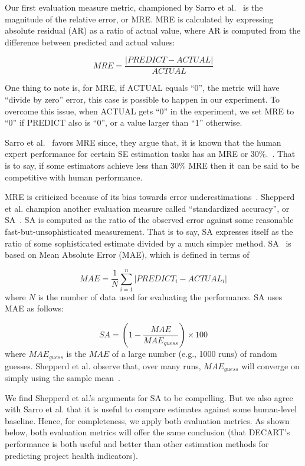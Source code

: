 \documentclass[sigconf,review,anonymous]{acmart}
\begin{document}
Our first evaluation measure metric, championed by  Sarro et al.~\cite{sarro2016multi} is the magnitude of the relative error, or MRE. MRE is calculated by expressing absolute residual (AR) as a ratio of actual value, where AR is computed from the difference between predicted and actual values:

\[
\mathit{MRE} = \frac{|\mathit{PREDICT} - \mathit{ACTUAL}|}{\mathit{ACTUAL}}
\]

One thing to note is, for MRE, if ACTUAL equals ``0'', the metric will have ``divide by zero'' error, this case is possible to happen in our experiment. To overcome this issue, when ACTUAL gets ``0'' in the experiment, we set MRE to ``0'' if PREDICT also is ``0'', or a value larger than ``1'' otherwise.

Sarro et al.~\cite{sarro2016multi} favors MRE
since, they argue that, it is known that the human expert performance
for certain SE estimation tasks  has an MRE or 30\%.~\cite{molokken2003review}. That is to say, if some estimators achieve less than 30\% MRE then it can be said to be competitive with human performance.  




MRE is criticized because of its bias towards error underestimations~\cite{foss2003simulation,kitchenham2001accuracy,korte2008confidence,port2008comparative,shepperd2000building,stensrud2003further}.  
Shepperd et al. champion another evaluation measure called ``standardized accuracy'', or SA~\cite{shepperd2012evaluating}.
SA is computed as the ratio of the observed error against some reasonable fast-but-unsophisticated measurement. That is to say, 
SA expresses itself as the ratio of some sophisticated estimate
divided by a much simpler method.
SA~\cite{langdon2016exact,shepperd2012evaluating} is based on Mean Absolute Error (MAE), which is defined in terms of 

\[
\mathit{MAE}=\frac{1}{N}\sum_{i=1}^n|\mathit{PREDICT}_i-\mathit{ACTUAL}_i|
\]
where $N$ is the number of data used for evaluating the performance. SA uses MAE as follows:

\[
\mathit{SA} = (1-\frac{\mathit{MAE}}{\mathit{MAE}_{guess}})\times 100
\]
where $\mathit{MAE}_{guess}$ is the $\mathit{MAE}$ of a large number (e.g., 1000 runs) of random guesses. 
  Shepperd et al. observe that, over many runs,  $\mathit{MAE}_{guess}$ will converge on simply using the sample mean~\cite{shepperd2012evaluating}. 

We find Shepperd et al.'s arguments for SA to be compelling. But we also agree with Sarro et al. that it is useful to   compare estimates against some human-level baseline. Hence, for completeness, we apply both evaluation metrics. As shown below, both evaluation metrics will offer the same conclusion (that DECART's performance is both useful and better than other estimation methods for predicting project health indicators).
\end{document}
